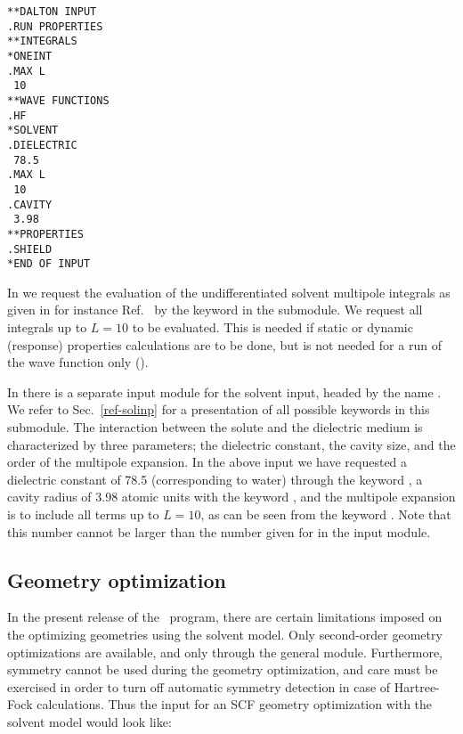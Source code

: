 \begin{verbatim}
**DALTON INPUT
.RUN PROPERTIES
**INTEGRALS
*ONEINT
.MAX L
 10
**WAVE FUNCTIONS
.HF
*SOLVENT
.DIELECTRIC
 78.5
.MAX L
 10
.CAVITY
 3.98
**PROPERTIES
.SHIELD
*END OF INPUT
\end{verbatim}

In  we request the evaluation of the undifferentiated solvent
multipole integrals as given in for instance
Ref.~\cite{kvmhahjajthjcp89} by the keyword  in the
 submodule. We request all 
integrals up to $L=10$ to be evaluated. This is needed if static or
dynamic (response) properties
calculations are to be done, but is not needed for a run of the
wave function only ().

In  there is a separate input module for the
solvent input, 
headed by the name . We refer to Sec.~\ref{ref-solinp}
for a presentation of all possible keywords in this submodule. The
interaction between the solute and the dielectric
medium is
characterized by three parameters; the dielectric
constant, the cavity
size, and the order of the multipole expansion. In the above input we have 
requested a dielectric constant of 78.5 (corresponding to water)
through the keyword , a cavity radius of 3.98 atomic
units with the keyword , and the multipole expansion is to
include all terms up to $L=10$, as can be seen from the keyword
. Note that this number cannot be larger than the number given for
 in the  input module.

\subsection{Geometry optimization}\label{sec:solventgeoopt}

In the present release of the \siraba\ program, there are certain
limitations imposed on the optimizing geometries using the solvent
model. Only second-order geometry optimizations  are available, and 
only through the general  module. Furthermore, symmetry
cannot be used during the geometry optimization, and care must be
exercised in order to turn off automatic symmetry detection in case of
Hartree-Fock calculations. Thus the input for an SCF geometry
optimization with the solvent model would look like:

